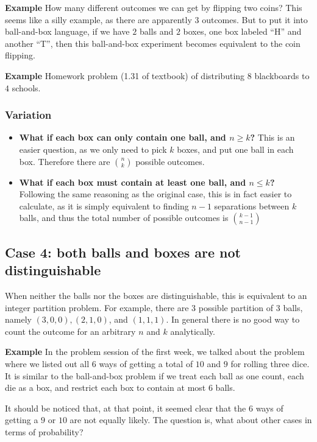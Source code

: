 \documentclass[12pt]{article}
\begin{document}
\textbf{Example} How many different outcomes we can get by flipping two coins? This seems like a silly example, as there are apparently $3$ outcomes. But to put it into ball-and-box language, if we have $2$ balls and $2$ boxes, one box labeled ``H'' and another ``T'', then this ball-and-box experiment becomes equivalent to the coin flipping.

\textbf{Example} Homework problem (1.31 of textbook) of distributing $8$ blackboards to $4$ schools.

\subsubsection{Variation}
\begin{itemize}
	\item \textbf{What if each box can only contain one ball, and $n \geq k$? } This is an easier question, as we only need to pick $k$ boxes, and put one ball in each box. Therefore there are ${n \choose k}$ possible outcomes.

	\item \textbf{What if each box must contain at least one ball, and $n \leq k$? } Following the same reasoning as the original case, this is in fact easier to calculate, as it is simply equivalent to finding $n-1$ separations between $k$ balls, and thus the total number of possible outcomes is ${k-1 \choose n-1}$
\end{itemize}


\subsection{Case 4: both balls and boxes are not distinguishable}
When neither the balls nor the boxes are distinguishable, this is equivalent to an integer partition problem. For example, there are 3 possible partition of 3 balls, namely $(3, 0, 0), (2, 1, 0)$, and $(1, 1, 1)$. In general there is no good way to count the outcome for an arbitrary $n$ and $k$ analytically. 


\textbf{Example} In the problem session of the first week, we talked about the problem where we listed out all $6$ ways of getting a total of $10$ and $9$ for rolling three dice. It is similar to the ball-and-box problem if we treat each ball as one count, each die as a box, and restrict each box to contain at most $6$ balls. 

It should be noticed that, at that point, it seemed clear that the $6$ ways of getting a $9$ or $10$ are not equally likely. The question is, what about other cases in terms of probability?
\end{document}

